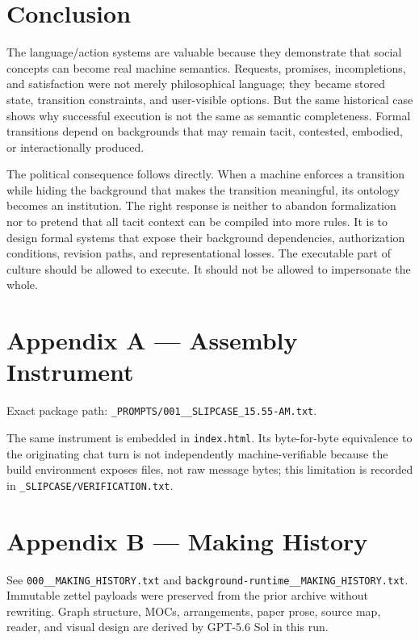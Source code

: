 \documentclass[11pt]{article}
\begin{document}
\section{Conclusion}

The language/action systems are valuable because they demonstrate that social concepts can become real machine semantics. Requests, promises, incompletions, and satisfaction were not merely philosophical language; they became stored state, transition constraints, and user-visible options. But the same historical case shows why successful execution is not the same as semantic completeness. Formal transitions depend on backgrounds that may remain tacit, contested, embodied, or interactionally produced.\par

The political consequence follows directly. When a machine enforces a transition while hiding the background that makes the transition meaningful, its ontology becomes an institution. The right response is neither to abandon formalization nor to pretend that all tacit context can be compiled into more rules. It is to design formal systems that expose their background dependencies, authorization conditions, revision paths, and representational losses. The executable part of culture should be allowed to execute. It should not be allowed to impersonate the whole.\par

\section*{Appendix A — Assembly Instrument}

Exact package path: \texttt{\_PROMPTS/001\_\_SLIPCASE\_15.55-AM.txt}.\par
The same instrument is embedded in \texttt{index.html}. Its byte-for-byte equivalence to the originating chat turn is not independently machine-verifiable because the build environment exposes files, not raw message bytes; this limitation is recorded in \texttt{\_SLIPCASE/VERIFICATION.txt}.\par

\section*{Appendix B — Making History}

See \texttt{000\_\_MAKING\_HISTORY.txt} and \texttt{background-runtime\_\_MAKING\_HISTORY.txt}. Immutable zettel payloads were preserved from the prior archive without rewriting. Graph structure, MOCs, arrangements, paper prose, source map, reader, and visual design are derived by GPT-5.6 Sol in this run.\par
\end{document}
